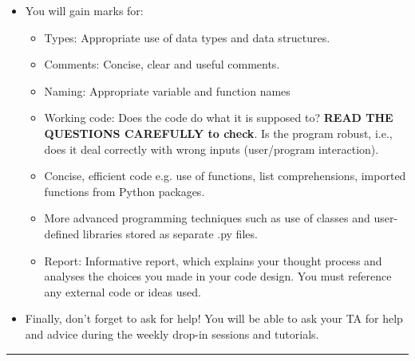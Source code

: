 \documentclass[11pt]{report}
\begin{document}
\begin{itemize}
	\item You will gain marks for: %
	\begin{itemize}
	    \item Types: Appropriate use of data types and data structures. 
	    \item Comments: Concise, clear and useful comments. 
	    \item Naming: Appropriate variable and function names
	    \item Working code: Does the code do what it is supposed to? {\bf READ THE QUESTIONS CAREFULLY to check}. Is the program robust, i.e., does it deal correctly with wrong inputs (user/program interaction).
	    \item Concise, efficient code e.g. use of functions,  list comprehensions, imported functions from Python packages. 
	    \item More advanced programming techniques such as use of classes and user-defined libraries stored as separate .py files. 
	    \item Report: Informative report, which explains your thought process and analyses the choices you made in your code design. You must reference any external code or ideas used.
	    
	\end{itemize}
	
	\item Finally, don't forget to ask for help! You will be able to ask your TA for help and advice during the weekly drop-in sessions and tutorials. 
\end{itemize}

\hrule
\end{document}
